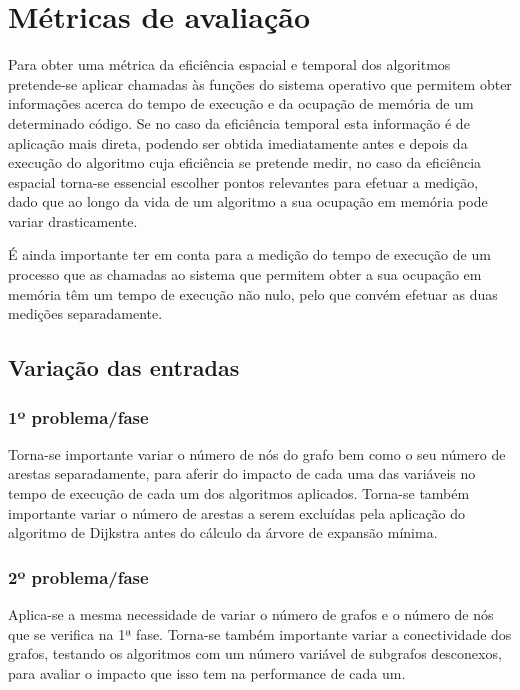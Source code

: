 \documentclass[a4paper,12pt,titlepage]{article}
\begin{document}
\section{Métricas de avaliação}
Para obter uma métrica da eficiência espacial e temporal dos algoritmos pretende-se aplicar chamadas às funções do sistema operativo que permitem obter informações acerca do tempo de execução e da ocupação de memória de um determinado código. Se no caso da eficiência temporal esta informação é de aplicação mais direta, podendo ser obtida imediatamente antes e depois da execução do algoritmo cuja eficiência se pretende medir, no caso da eficiência espacial torna-se essencial escolher pontos relevantes para efetuar a medição, dado que ao longo da vida de um algoritmo a sua ocupação em memória pode variar drasticamente.
 
É ainda importante ter em conta para a medição do tempo de execução de um processo que as chamadas ao sistema que permitem obter a sua ocupação em memória têm um tempo de execução não nulo, pelo que convém efetuar as duas medições separadamente.
\subsection{Variação das entradas}
\subsubsection{1º problema/fase}
Torna-se importante variar o número de nós do grafo bem como o seu número de arestas separadamente, para aferir do impacto de cada uma das variáveis no tempo de execução de cada um dos algoritmos aplicados. Torna-se também importante variar o número de arestas a serem excluídas pela aplicação do algoritmo de Dijkstra antes do cálculo da árvore de expansão mínima. 
\subsubsection{2º problema/fase}
Aplica-se a mesma necessidade de variar o número de grafos e o número de nós que se verifica na 1ª fase. Torna-se também importante variar a conectividade dos grafos, testando os algoritmos com um número variável de subgrafos desconexos, para avaliar o impacto que isso tem na performance de cada um.




\newpage


\end{document}
